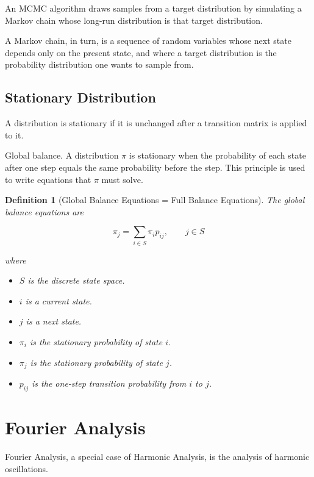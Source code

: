 \documentclass{article}
\newtheorem{definition}{Definition}
\begin{document}
An MCMC algorithm draws samples from a target distribution by simulating a Markov chain whose long-run distribution is that target distribution.

A Markov chain, in turn, is a sequence of random variables whose next state depends only on the present state, and where a target distribution is the probability distribution one wants to sample from.

\subsection{Stationary Distribution}
A distribution is stationary if it is unchanged after a transition matrix is applied to it.

Global balance. A distribution $\pi$ is stationary when the probability of each state after one step equals the same probability before the step. This principle is used to write equations that $\pi$ must solve.

\begin{mdframed}
\begin{definition}[Global Balance Equations = Full Balance Equations]
The global balance equations are

$$
\pi_j = \sum_{i \in S} \pi_i p_{ij}, \qquad j \in S
$$

where

\begin{itemize}
    \item $S$ is the discrete state space.
    \item $i$ is a current state.
    \item $j$ is a next state.
    \item $\pi_i$ is the stationary probability of state $i$.
    \item $\pi_j$ is the stationary probability of state $j$.
    \item $p_{ij}$ is the one-step transition probability from $i$ to $j$.
\end{itemize}
\end{definition}
\end{mdframed}

\newpage
\section{Fourier Analysis}
Fourier Analysis, a special case of Harmonic Analysis, is the analysis of harmonic oscillations. 
\end{document}
